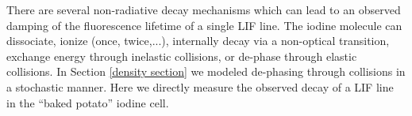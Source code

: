 There are several non-radiative decay mechanisms which can lead to an observed damping of the fluorescence lifetime of a single LIF line. The iodine molecule can dissociate, ionize (once, twice,...), internally decay via a non-optical transition, exchange energy through inelastic collisions, or de-phase through elastic collisions. In Section \ref{density section} we modeled de-phasing through collisions in a stochastic manner. Here we directly measure the observed decay of a LIF line in the ``baked potato'' iodine cell.
